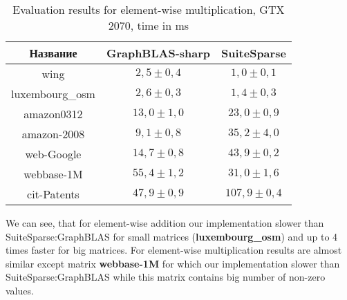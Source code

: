\begin{table}[h]

    \centering
    \caption{Evaluation results for element-wise multiplication, GTX 2070, time in ms}
    \label{mult-comparison}
    
    \begin{tabular}{|c||c|c|}
    \hline
    Название            & GraphBLAS-sharp & SuiteSparse    \\
    \hline
    \hline
    wing            & $2,5 \pm 0,4$      & $1,0 \pm 0,1$ \\
    \hline
    luxembourg\_osm & $2,6 \pm 0,3$       & $1,4 \pm 0,3$ \\
    \hline
    amazon0312      & $13,0 \pm 1,0$     & $23,0 \pm 0,9$ \\
    \hline
    amazon-2008     & $9,1 \pm 0,8$    & $35,2 \pm 4,0$ \\
    \hline
    web-Google      & $14,7 \pm 0,8$      & $43,9 \pm 0,2$  \\
    \hline
    webbase-1M      & $55,4 \pm 1,2$      & $31,0 \pm 1,6$ \\
    \hline
    cit-Patents     & $47,9 \pm 0,9$      & $107,9 \pm 0,4$  \\     
    \hline
    \end{tabular}
\end{table}

We can see, that for element-wise addition our implementation slower than SuiteSparse:GraphBLAS for small matrices (\textbf{luxembourg\_osm}) and up to 4 times faster for big matrices.
For element-wise multiplication results are almost similar except matrix \textbf{webbase-1M} for which our implementation slower than SuiteSparse:GraphBLAS while this matrix contains big number of non-zero values.



